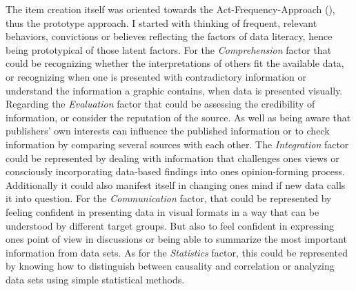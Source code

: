 \documentclass[
  12pt,
  a4paper,
  twoside]{article}
\begin{document}
The item creation itself was oriented towards the Act-Frequency-Approach (), thus the prototype approach.
I started with thinking of frequent, relevant behaviors, convictions or believes reflecting the factors of data literacy, hence being prototypical of those latent factors.
For the \emph{Comprehension} factor that could be recognizing whether the interpretations of others fit the available data, or recognizing when one is presented with contradictory information or understand the information a graphic contains, when data is presented visually.
Regarding the \emph{Evaluation} factor that could be assessing the credibility of information, or consider the reputation of the source. As well as being aware that publishers' own interests can influence the published information or to check information by comparing several sources with each other.
The \emph{Integration} factor could be represented by dealing with information that challenges ones views or consciously incorporating data-based findings into ones opinion-forming process. Additionally it could also manifest itself in changing ones mind if new data calls it into question.
For the \emph{Communication} factor, that could be represented by feeling confident in presenting data in visual formats in a way that can be understood by different target groups. But also to feel confident in expressing ones point of view in discussions or being able to summarize the most important information from data sets.
As for the \emph{Statistics} factor, this could be represented by knowing how to distinguish between causality and correlation or analyzing data sets using simple statistical methods.
\end{document}
